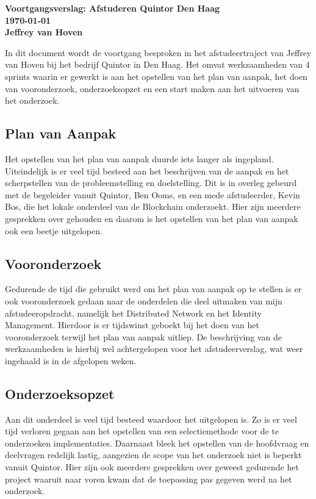 \documentclass{report}
\begin{document}
    {
      \bfseries\centering 
      Voortgangsverslag: Afstuderen Quintor Den Haag \\
      \today \\
      Jeffrey van Hoven
    \par}
    \vspace{1cm}
    
    {\centering
      In dit document wordt de voortgang besproken in het afstudeertraject van Jeffrey van Hoven bij het bedrijf Quintor in Den Haag. Het omvat werkzaamheden van 4 sprints waarin er gewerkt is aan het opstellen van het plan van aanpak, het doen van vooronderzoek, onderzoeksopzet en een start maken aan het uitvoeren van het onderzoek.
    \par}
    \begin{multicols}{2}
        \subsection*{Plan van Aanpak}
        Het opstellen van het plan van aanpak duurde iets langer als ingepland. Uiteindelijk is er veel tijd besteed aan het beschrijven van de aanpak en het scherpstellen van de probleemstelling en doelstelling. Dit is in overleg gebeurd met de begeleider vanuit Quintor, Ben Ooms, en een mede afstudeerder, Kevin Bos, die het lokale onderdeel van de Blockchain onderzoekt. Hier zijn meerdere gesprekken over gehouden en daarom is het opstellen van het plan van aanpak ook een beetje uitgelopen.

        \subsection*{Vooronderzoek}
        Gedurende de tijd die gebruikt werd om het plan van aanpak op te stellen is er ook vooronderzoek gedaan naar de onderdelen die deel uitmaken van mijn afstudeeropdracht, namelijk het Distributed Network en het Identity Management. Hierdoor is er tijdswinst geboekt bij het doen van het vooronderzoek terwijl het plan van aanpak uitliep. De beschrijving van de werkzaamheden is hierbij wel achtergelopen voor het afstudeerverslag, wat weer ingehaald is in de afgelopen weken.

        \subsection*{Onderzoeksopzet}
        Aan dit onderdeel is veel tijd besteed waardoor het uitgelopen is. Zo is er veel tijd verloren gegaan aan het opstellen van een selectiemethode voor de te onderzoeken implementaties. Daarnaast bleek het opstellen van de hoofdvraag en deelvragen redelijk lastig, aangezien de scope van het onderzoek niet is beperkt vanuit Quintor. Hier zijn ook meerdere gesprekken over geweest gedurende het project waaruit naar voren kwam dat de toepassing pas gegeven werd na het onderzoek.


\end{multicols}
\end{document}
